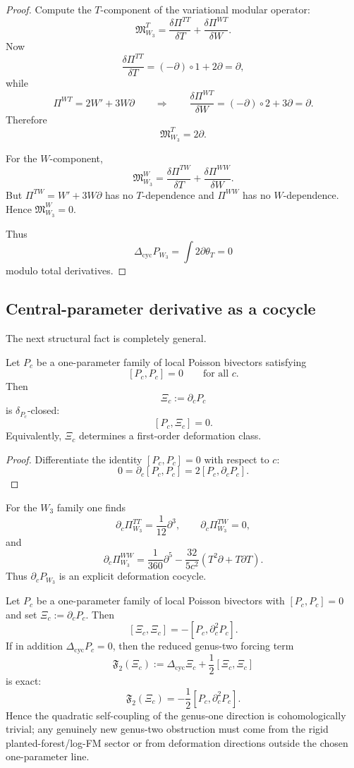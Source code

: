\begin{proof}
Compute the $T$-component of the variational modular operator:
\[
\mathfrak M_{W_3}^T
=
\frac{\delta \Pi^{TT}}{\delta T}
+
\frac{\delta \Pi^{WT}}{\delta W}.
\]
Now
\[
\frac{\delta \Pi^{TT}}{\delta T}=(-\partial)\circ 1+2\partial=\partial,
\]
while
\[
\Pi^{WT}=2W'+3W\partial
\qquad\Longrightarrow\qquad
\frac{\delta \Pi^{WT}}{\delta W}=(-\partial)\circ 2 + 3\partial=\partial.
\]
Therefore
\[
\mathfrak M_{W_3}^T=2\partial.
\]

For the $W$-component,
\[
\mathfrak M_{W_3}^W
=
\frac{\delta \Pi^{TW}}{\delta T}
+
\frac{\delta \Pi^{WW}}{\delta W}.
\]
But $\Pi^{TW}=W'+3W\partial$ has no $T$-dependence and $\Pi^{WW}$ has no $W$-dependence.
Hence $\mathfrak M_{W_3}^W=0$.

Thus
\[
\Delta_{\mathrm{cyc}}P_{W_3}=\int 2\partial\theta_T=0
\]
modulo total derivatives.
\end{proof}

\subsection{Central-parameter derivative as a cocycle}

The next structural fact is completely general.

\begin{theorem}\label{thm:parameter-cocycle}
Let $P_c$ be a one-parameter family of local Poisson bivectors satisfying
\[
[P_c,P_c]=0
\qquad\text{for all }c.
\]
Then
\[
\Xi_c:=\partial_c P_c
\]
is $\delta_{P_c}$-closed:
\[
[P_c,\Xi_c]=0.
\]
Equivalently, $\Xi_c$ determines a first-order deformation class.
\end{theorem}

\begin{proof}
Differentiate the identity $[P_c,P_c]=0$ with respect to $c$:
\[
0=\partial_c[P_c,P_c]=2[P_c,\partial_cP_c].
\]
\end{proof}

For the $W_3$ family one finds
\[
\partial_c \Pi^{TT}_{W_3}=\frac1{12}\partial^3,\qquad
\partial_c\Pi^{TW}_{W_3}=0,
\]
and
\[
\partial_c \Pi^{WW}_{W_3}
=
\frac1{360}\partial^5-\frac{32}{5c^2}(T^2\partial+T\partial T).
\]
Thus $\partial_c P_{W_3}$ is an explicit deformation cocycle.


\begin{proposition}
\label{prop:quadratic-genus-two-line}
Let $P_c$ be a one-parameter family of local Poisson bivectors with
$[P_c,P_c]=0$ and set $\Xi_c:=\partial_cP_c$.  Then
\[
[\Xi_c,\Xi_c]=-[P_c,\partial_c^2P_c].
\]
If in addition $\Delta_{\mathrm{cyc}}P_c=0$, then the reduced genus-two
forcing term
\[
\mathfrak F_2(\Xi_c)
:=
\Delta_{\mathrm{cyc}}\Xi_c+\frac12[\Xi_c,\Xi_c]
\]
is exact:
\[
\mathfrak F_2(\Xi_c)
=
-\frac12[P_c,\partial_c^2P_c].
\]
Hence the quadratic self-coupling of the genus-one direction is
cohomologically trivial; any genuinely new genus-two obstruction must come
from the rigid planted-forest/log-FM sector or from deformation directions
outside the chosen one-parameter line.
\end{proposition}

